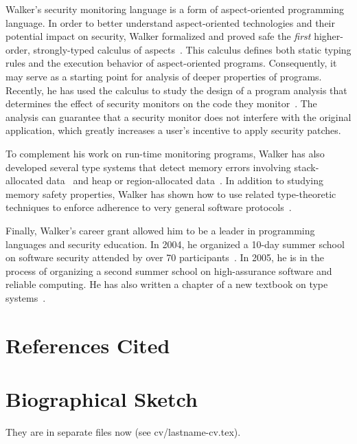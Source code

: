 \documentclass[11pt]{article}
\begin{document}
Walker's security monitoring language is a form of aspect-oriented programming language.
In order to better understand aspect-oriented technologies and their
potential impact on security, Walker formalized and proved
safe the {\em first} higher-order, strongly-typed calculus of 
aspects~\cite{walker+:aspects}.  This calculus defines
both static typing rules and the execution behavior of aspect-oriented
programs.  Consequently, it may
serve as a starting point for analysis of deeper properties of programs.
Recently, he has used the calculus to study the design of a
program analysis that determines the effect of security monitors on
the code they monitor~\cite{dantas+:harmless-advice}.   The analysis
can guarantee that a security monitor does not interfere with the 
original application, which greatly increases a user's incentive
to apply security patches.

To complement his work on run-time monitoring programs, Walker has also
developed several type systems that detect memory errors involving
stack-allocated data~\cite{ahmed+:stack} and heap or region-allocated
data~\cite{ahmed+:hierarchical-storage}.  In addition to studying memory safety
properties, Walker has shown how to use related type-theoretic techniques
to enforce adherence to very general software
protocols~\cite{mandelbaum+:refinements}.  

Finally, Walker's career grant allowed him to be a leader in
programming languages and security education. In 2004, he organized
a 10-day summer school on software security 
attended by over 70 participants~\cite{summerschool04}.  In 2005, he is in the process of
organizing a second summer school on high-assurance software and reliable computing.  He has also written a
chapter of a new textbook on type systems~\cite{walker:attapl}.



\newpage
\section{References Cited}
{
 \small
} \newpage
\section{Biographical Sketch}
%

They are in separate files now (see cv/lastname-cv.tex).
\end{document}
